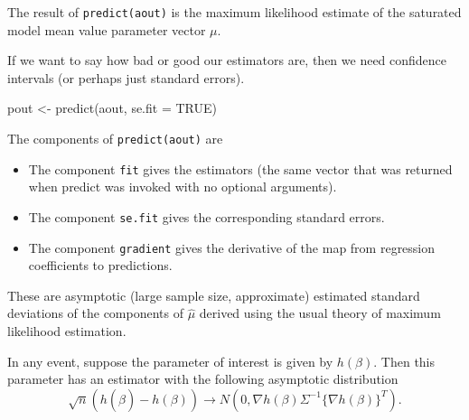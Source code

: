 \documentclass[
  ignorenonframetext,
]{beamer}
\newenvironment{Shaded}{\begin{snugshade}}{\end{snugshade}}
\newcommand{\AttributeTok}[1]{\textcolor[rgb]{0.77,0.63,0.00}{#1}}
\newcommand{\ConstantTok}[1]{\textcolor[rgb]{0.00,0.00,0.00}{#1}}
\newcommand{\FunctionTok}[1]{\textcolor[rgb]{0.00,0.00,0.00}{#1}}
\newcommand{\NormalTok}[1]{#1}
\newcommand{\OtherTok}[1]{\textcolor[rgb]{0.56,0.35,0.01}{#1}}
\begin{document}
\begin{frame}[fragile]{}
\protect\hypertarget{section-27}{}
The result of \texttt{predict(aout)} is the maximum likelihood estimate
of the saturated model mean value parameter vector \(\mu\).

If we want to say how bad or good our estimators are, then we need
confidence intervals (or perhaps just standard errors).

\vspace{12pt}
\tiny

\begin{Shaded}
\begin{Highlighting}[]
\NormalTok{pout }\OtherTok{\textless{}{-}} \FunctionTok{predict}\NormalTok{(aout, }\AttributeTok{se.fit =} \ConstantTok{TRUE}\NormalTok{)}
\end{Highlighting}
\end{Shaded}

\vspace{12pt}
\normalsize

The components of \texttt{predict(aout)} are

\begin{itemize}
  \item The component \texttt{fit} gives the estimators (the same vector that was returned when predict was invoked with no optional arguments).
  \item The component \texttt{se.fit} gives the corresponding standard errors.
  \item The component \texttt{gradient} gives the derivative of the map from regression coefficients to predictions.
\end{itemize}
\end{frame}

\begin{frame}{}
\protect\hypertarget{section-28}{}
These are asymptotic (large sample size, approximate) estimated standard
deviations of the components of \(\hat\mu\) derived using the usual
theory of maximum likelihood estimation.

In any event, suppose the parameter of interest is given by
\(h(\beta)\). Then this parameter has an estimator with the following
asymptotic distribution \[
  \sqrt{n}(h(\hat\beta) - h(\beta)) \to N\left(0, \nabla h(\beta)\Sigma^{-1} \{\nabla h(\beta)\}^T \right).
\]
\end{frame}
\end{document}
